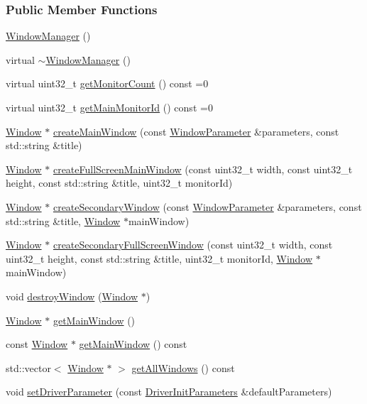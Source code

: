 \subsubsection*{Public Member Functions}
\begin{DoxyCompactItemize}
\item 
\hyperlink{a00087_a6749235b97d99fd37e3364b5028c05f4}{Window\+Manager} ()
\item 
virtual \hyperlink{a00087_a86a0bbdde5137d9fefdb3fd3d2f4ba27}{$\sim$\+Window\+Manager} ()
\item 
virtual uint32\+\_\+t \hyperlink{a00087_ab0508dca59ae0d5366158385b75ae8b6}{get\+Monitor\+Count} () const  =0
\item 
virtual uint32\+\_\+t \hyperlink{a00087_ae1c80e3385179a2908316ac74c2fc520}{get\+Main\+Monitor\+Id} () const  =0
\item 
\hyperlink{a00082}{Window} $\ast$ \hyperlink{a00087_a863ac648c2c2a93a57c4a898fb176718}{create\+Main\+Window} (const \hyperlink{a00091}{Window\+Parameter} \&parameters, const std\+::string \&title)
\item 
\hyperlink{a00082}{Window} $\ast$ \hyperlink{a00087_a9c2adc3003612cafb99fd7a156bc9655}{create\+Full\+Screen\+Main\+Window} (const uint32\+\_\+t width, const uint32\+\_\+t height, const std\+::string \&title, uint32\+\_\+t monitor\+Id)
\item 
\hyperlink{a00082}{Window} $\ast$ \hyperlink{a00087_afc8f953d7aa1e2822b8ced1e5b855ab8}{create\+Secondary\+Window} (const \hyperlink{a00091}{Window\+Parameter} \&parameters, const std\+::string \&title, \hyperlink{a00082}{Window} $\ast$main\+Window)
\item 
\hyperlink{a00082}{Window} $\ast$ \hyperlink{a00087_a8d3b6392e5389e7e5706f92ceed96fa0}{create\+Secondary\+Full\+Screen\+Window} (const uint32\+\_\+t width, const uint32\+\_\+t height, const std\+::string \&title, uint32\+\_\+t monitor\+Id, \hyperlink{a00082}{Window} $\ast$main\+Window)
\item 
void \hyperlink{a00087_aecfb9aa6471ecf82e5c76a96440c275c}{destroy\+Window} (\hyperlink{a00082}{Window} $\ast$)
\item 
\hyperlink{a00082}{Window} $\ast$ \hyperlink{a00087_a7ccb3265cab90117a4face1c5ebb5e29}{get\+Main\+Window} ()
\item 
const \hyperlink{a00082}{Window} $\ast$ \hyperlink{a00087_aa59c328988c32399328f8f38c5210275}{get\+Main\+Window} () const 
\item 
std\+::vector$<$ \hyperlink{a00082}{Window} $\ast$ $>$ \hyperlink{a00087_a9aac4dcdd92008cd8602b7456be6260a}{get\+All\+Windows} () const 
\item 
void \hyperlink{a00087_a9aaa765ab360c7093dd1f1d3f5f3d621}{set\+Driver\+Parameter} (const \hyperlink{a00028}{Driver\+Init\+Parameters} \&default\+Parameters)
\end{DoxyCompactItemize}
